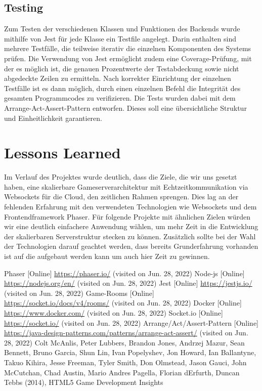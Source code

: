 \documentclass[conference]{IEEEtran}
\begin{document}
\subsection{Testing}
Zum Testen der verschiedenen Klassen und Funktionen des Backends wurde mithilfe von Jest für jede Klasse ein Testfile angelegt. Darin enthalten sind mehrere Testfälle, die teilweise iterativ die einzelnen Komponenten des Systems prüfen. Die Verwendung von Jest\cite{jest} ermöglicht zudem eine Coverage-Prüfung, mit der es möglich ist, die genauen Prozentwerte der Testabdeckung sowie nicht abgedeckte Zeilen zu ermitteln. Nach korrekter Einrichtung der einzelnen Testfälle ist es dann möglich, durch einen einzelnen Befehl die Integrität des gesamten Programmcodes zu verifizieren. Die Tests wurden dabei mit dem Arrange-Act-Assert-Pattern\cite{aaa} entworfen. Dieses soll eine übersichtliche Struktur und Einheitlichkeit garantieren.

\section{Lessons Learned}
Im Verlauf des Projektes wurde deutlich, dass die Ziele, die wir uns gesetzt haben, eine skalierbare Gameserverarchitektur mit Echtzeitkommunikation via Websockets für die Cloud, den zeitlichen Rahmen sprengen. Dies lag an der fehlenden Erfahrung mit den verwendeten Technologien wie Websockets und dem Frontendframework Phaser. Für folgende Projekte mit ähnlichen Zielen würden wir eine deutlich einfachere Anwendung wählen, um mehr Zeit in die Entwicklung der skalierbaren Serverstruktur stecken zu können. Zusätzlich sollte bei der Wahl der Technologien darauf geachtet werden, dass bereits Grunderfahrung vorhanden ist auf die aufgebaut werden kann um auch hier Zeit zu gewinnen.

\begin{thebibliography}{0}
	Phaser [Online] \url{https://phaser.io/} (visited on Jun. 28, 2022)
    Node-js [Online] \url{https://nodejs.org/en/} (visited on Jun. 28, 2022)
    Jest [Online] \url{https://jestjs.io/} (visited on Jun. 28, 2022)
    Game-Rooms [Online] \url{https://socket.io/docs/v4/rooms/} (visited on Jun. 28, 2022)
    Docker [Online] \url{https://www.docker.com/} (visited on Jun. 28, 2022)
    Socket.io [Online] \url{https://socket.io/} (visited on Jun. 28, 2022)
    Arrange/Act/Assert-Pattern [Online] \url{https://java-design-patterns.com/patterns/arrange-act-assert/} (visited on Jun. 28, 2022)
     Colt McAnlis, Peter Lubbers, Brandon Jones, Andrzej Mazur, Sean Bennett, Bruno Garcia, Shun Lin, Ivan Popelyshev, Jon Howard, Ian Ballantyne, Takuo Kihira, Jesse Freeman, Tyler Smith, Don Olmstead, Jason Gauci, John McCutchan, Chad Austin, Mario Andres Pagella, Florian dErfurth, Duncan Tebbs (2014), HTML5 Game Development Insights
\end{thebibliography}
\end{document}
